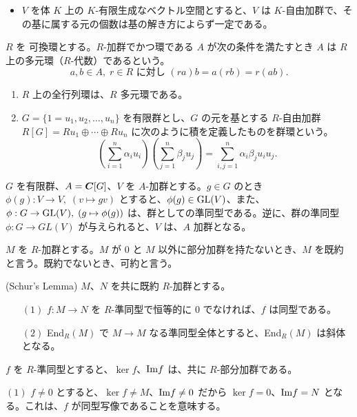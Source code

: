 \begin{itemize}
\item $V$ を体 $K$ 上の $K$-有限生成なベクトル空間とすると、$V$ は $K$-自由加群で、その基に属する元の個数は基の解き方によらず一定である。
\end{itemize}

\begin{definition}
$R$ を 可換環とする。$R$-加群でかつ環である $A$ が次の条件を満たすとき $A$ は $R$ 上の多元環（$R$-代数）であるという。
$$a, b\in A,\;r\in R\mbox{ に対し }(ra)b = a(rb) = r(ab).$$
\end{definition}

\begin{eg}
\begin{enumerate}
\item $R$ 上の全行列環は、$R$ 多元環である。
\item $G = \{1 = u_1, u_2, \ldots, u_n\}$ を有限群とし、$G$ の元を基とする $R$-自由加群 $R[G] = Ru_1 \oplus \cdots \oplus Ru_n$ に次のように積を定義したものを群環という。
$$\left(\sum_{i=1}^n\alpha_iu_i\right)\left(\sum_{j=1}^n\beta_ju_j\right) = \sum_{i,j = 1}^n\alpha_i\beta_ju_iu_j.$$
\end{enumerate}
\end{eg}

$G$ を有限群、$A = \mbox{\boldmath $C$}[G]$、$V$ を $A$-加群とする。$g\in G$ のとき $\phi(g) : V\to V, \;(v\mapsto gv)$ とすると、$\phi(g)\in \mbox{{\rm GL}}(V)$、また、$\phi: G\to \mbox{{\rm GL}}(V), \;(g\mapsto \phi(g))$ は、群としての準同型である。逆に、群の準同型 $\phi:G\to GL(V)$ が与えられると、$V$ は、$A$ 加群となる。

\medskip
$M$ を $R$-加群とする。$M$ が $0$ と $M$ 以外に部分加群を持たないとき、$M$ を既約と言う。既約でないとき、可約と言う。

\begin{thm}{\rm (Schur's Lemma)} \label{thm:schurslemma}
$M$、$N$ を共に既約 $R$-加群とする。
\begin{itemize}
\item[$(1)$] $f:M\to N$ を $R$-準同型で恒等的に $0$ でなければ、$f$ は同型である。
\item[$(2)$] End${}_R(M)$ で $M\to M$ なる準同型全体とすると、End${}_R(M)$ は斜体となる。
\end{itemize}
\end{thm}
\proof
$f$ を $R$-準同型とすると、$\ker f$、$\mbox{{\rm Im}} f$ は、共に $R$-部分加群である。

$(1)$ $f\neq 0$ とすると、$\ker f \neq M$、$\mbox{{\rm Im}} f\neq 0$ だから $\ker f = 0$、$\mbox{{\rm Im}} f = N$ となる。これは、$f$ が同型写像であることを意味する。

